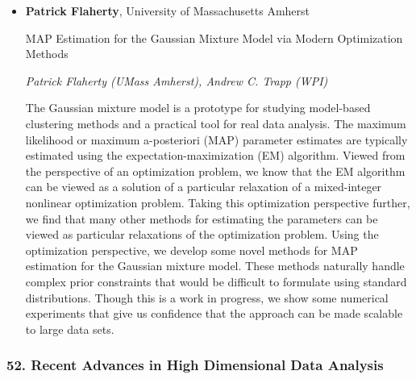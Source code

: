 \begin{itemize}
\item \textbf{Patrick Flaherty}, University of Massachusetts Amherst

MAP Estimation for the Gaussian Mixture Model via Modern Optimization Methods

\emph{\footnotesize Patrick Flaherty (UMass Amherst), Andrew C. Trapp (WPI)}

The Gaussian mixture model is a prototype for studying model-based clustering methods and a practical tool for real data analysis. The maximum likelihood or maximum a-posteriori (MAP) parameter estimates are typically estimated using the expectation-maximization (EM) algorithm. Viewed from the perspective of an optimization problem, we know that the EM algorithm can be viewed as a solution of a particular relaxation of a mixed-integer nonlinear optimization problem. Taking this optimization perspective further, we find that many other methods for estimating the parameters can be viewed as particular relaxations of the optimization problem. Using the optimization perspective, we develop some novel methods for MAP estimation for the Gaussian mixture model. These methods naturally handle complex prior constraints that would be difficult to formulate using standard distributions. Though this is a work in progress, we show some numerical experiments that give us confidence that the approach can be made scalable to large data sets.

\end{itemize}

\subsubsection*{52. Recent Advances in High Dimensional Data Analysis}

